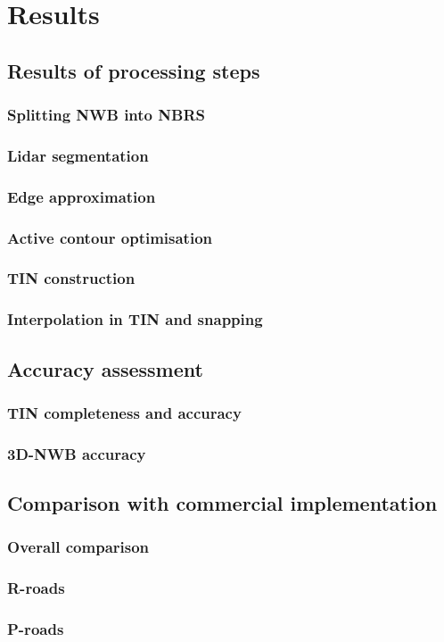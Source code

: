 
\chapter{Results}
\label{chap:r}

\section{Results of processing steps}
\label{sec:results}

\subsection{Splitting NWB into NBRS}
\subsection{Lidar segmentation}
\subsection{Edge approximation}
\subsection{Active contour optimisation}
\subsection{TIN construction}
\subsection{Interpolation in TIN and snapping}

\section{Accuracy assessment}
\label{sec:accuracy}

\subsection{TIN completeness and accuracy}
\subsection{3D-NWB accuracy}

\section{Comparison with commercial implementation}
\label{sec:comparison}

\subsection{Overall comparison}
\subsection{R-roads}
\subsection{P-roads}